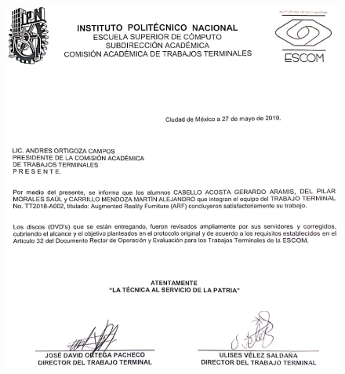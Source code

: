 
\begin{titlepage}
	\begin{figure}[H]
		\centering
		\includegraphics[width=17cm,height=20cm]{imagenes/carta.png}
	\end{figure} 
\begin{titlepage}


\end{titlepage}
\end{titlepage}
